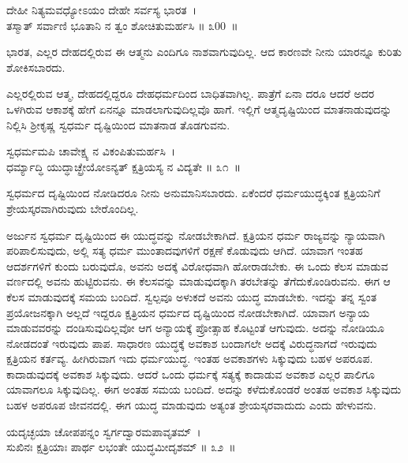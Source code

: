 \begin{shloka}
ದೇಹೀ ನಿತ್ಯಮವಧ್ಯೋಽಯಂ ದೇಹೇ ಸರ್ವಸ್ಯ ಭಾರತ~।\\ತಸ್ಮಾತ್ ಸರ್ವಾಣಿ ಭೂತಾನಿ ನ ತ್ವಂ ಶೋಚಿತುಮರ್ಹಸಿ \hfill॥ ೩00~॥
\end{shloka}

\begin{artha}
ಭಾರತ, ಎಲ್ಲರ ದೇಹದಲ್ಲಿರುವ ಈ ಆತ್ಮನು ಎಂದಿಗೂ ನಾಶವಾಗುವುದಿಲ್ಲ. ಆದ ಕಾರಣವೇ ನೀನು ಯಾರನ್ನೂ ಕುರಿತು ಶೋಕಿಸಬಾರದು.
\end{artha}

ಎಲ್ಲರಲ್ಲಿರುವ ಆತ್ಮ, ದೇಹದಲ್ಲಿದ್ದರೂ ದೇಹಧರ್ಮದಿಂದ ಬಾಧಿತವಾಗಿಲ್ಲ. ಪಾತ್ರೆಗೆ ಏನಾ ದರೂ ಆದರೆ ಅದರ ಒಳಗಿರುವ ಆಕಾಶಕ್ಕೆ ಹೇಗೆ ಏನನ್ನೂ ಮಾಡಲಾಗುವುದಿಲ್ಲವೊ ಹಾಗೆ. ಇಲ್ಲಿಗೆ ಆತ್ಮದೃಷ್ಟಿಯಿಂದ ಮಾತನಾಡುವುದನ್ನು ನಿಲ್ಲಿಸಿ ಶ‍್ರೀಕೃಷ್ಣ ಸ್ವಧರ್ಮ ದೃಷ್ಟಿಯಿಂದ ಮಾತನಾಡ ತೊಡಗುವನು.

\begin{shloka}
ಸ್ವಧರ್ಮಮಪಿ ಚಾವೇಕ್ಷ್ಯ ನ ವಿಕಂಪಿತುಮರ್ಹಸಿ~।\\ಧರ್ಮ್ಯಾದ್ಧಿ ಯುದ್ಧಾಚ್ಛ್ರೇಯೋಽನ್ಯತ್ ಕ್ಷತ್ರಿಯಸ್ಯ ನ ವಿದ್ಯತೇ \hfill॥ ೩೧~॥
\end{shloka}

\begin{artha}
ಸ್ವಧರ್ಮದ ದೃಷ್ಟಿಯಿಂದ ನೋಡಿದರೂ ನೀನು ಅನುಮಾನಿಸಬಾರದು. ಏಕೆಂದರೆ ಧರ್ಮಯುದ್ಧಕ್ಕಿಂತ ಕ್ಷತ್ರಿಯನಿಗೆ ಶ್ರೇಯಸ್ಕರವಾಗಿರುವುದು ಬೇರೊಂದಿಲ್ಲ.
\end{artha}

ಅರ್ಜುನ ಸ್ವಧರ್ಮ ದೃಷ್ಟಿಯಿಂದ ಈ ಯುದ್ಧವನ್ನು ನೋಡಬೇಕಾಗಿದೆ. ಕ್ಷತ್ರಿಯನ ಧರ್ಮ ರಾಜ್ಯವನ್ನು ನ್ಯಾಯವಾಗಿ ಪರಿಪಾಲಿಸುವುದು, ಅಲ್ಲಿ ಸತ್ಯ ಧರ್ಮ ಮುಂತಾದವುಗಳಿಗೆ ರಕ್ಷಣೆ ಕೊಡುವುದು ಆಗಿದೆ. ಯಾವಾಗ ಇಂತಹ ಆದರ್ಶಗಳಿಗೆ ಕುಂದು ಬರುವುದೊ, ಅವನು ಅದಕ್ಕೆ ವಿರೋಧವಾಗಿ ಹೋರಾಡಬೇಕು. ಈ ಒಂದು ಕೆಲಸ ಮಾಡುವ ವರ್ಣದಲ್ಲಿ ಅವನು ಹುಟ್ಟಿರುವನು. ಈ ಕೆಲಸವನ್ನು ಮಾಡುವುದಕ್ಕಾಗಿ ತರಬೇತನ್ನು ತೆಗೆದುಕೊಂಡಿರುವನು. ಈಗ ಆ ಕೆಲಸ ಮಾಡುವುದಕ್ಕೆ ಸಮಯ ಬಂದಿದೆ. ಸ್ವಲ್ಪವೂ ಅಳುಕದೆ ಅವನು ಯುದ್ಧ ಮಾಡಬೇಕು. ಇದನ್ನು ತನ್ನ ಸ್ವಂತ ಪ್ರಯೋಜನಕ್ಕಾಗಿ ಅಲ್ಲದೆ ಇದ್ದರೂ ಕ್ಷತ್ರಿಯನ ಧರ್ಮದ ದೃಷ್ಟಿಯಿಂದ ನೋಡಬೇಕಾಗಿದೆ. ಯಾವಾಗ ಅನ್ಯಾಯ ಮಾಡುವವರನ್ನು ದಂಡಿಸುವುದಿಲ್ಲವೋ ಆಗ ಅನ್ಯಾಯಕ್ಕೆ ಪ್ರೋತ್ಸಾಹ ಕೊಟ್ಟಂತೆ ಆಗುವುದು. ಅದನ್ನು ನೋಡಿಯೂ ನೋಡದಂತೆ ಇರುವುದು ಪಾಪ. ಸಾಧಾರಣ ಯುದ್ಧಕ್ಕೆ ಅವಕಾಶ ಬಂದಾಗಲೇ ಅದಕ್ಕೆ ವಿರುದ್ಧನಾಗದೆ ಇರುವುದು ಕ್ಷತ್ರಿಯನ ಕರ್ತವ್ಯ. ಹೀಗಿರುವಾಗ ಇದು ಧರ್ಮಯುದ್ಧ. ಇಂತಹ ಅವಕಾಶಗಳು ಸಿಕ್ಕುವುದು ಬಹಳ ಅಪರೂಪ. ಕಾದಾಡುವುದಕ್ಕೆ ಅವಕಾಶ ಸಿಕ್ಕುವುದು. ಆದರೆ ಒಂದು ಧರ್ಮಕ್ಕೆ ಸತ್ಯಕ್ಕೆ ಕಾದಾಡುವ ಅವಕಾಶ ಎಲ್ಲರ ಪಾಲಿಗೂ ಯಾವಾಗಲೂ ಸಿಕ್ಕುವುದಿಲ್ಲ. ಈಗ ಅಂತಹ ಸಮಯ ಬಂದಿದೆ. ಅದನ್ನು ಕಳೆದುಕೊಂಡರೆ ಅಂತಹ ಅವಕಾಶ ಸಿಕ್ಕುವುದು ಬಹಳ ಅಪರೂಪ ಜೀವನದಲ್ಲಿ. ಈಗ ಯುದ್ಧ ಮಾಡುವುದು ಅತ್ಯಂತ ಶ್ರೇಯಸ್ಕರವಾದುದು ಎಂದು ಹೇಳುವನು.

\begin{shloka}
ಯದೃಚ್ಛಯಾ ಚೋಪಪನ್ನಂ ಸ್ವರ್ಗದ್ವಾರಮಪಾವೃತಮ್~।\\ಸುಖಿನಃ ಕ್ಷತ್ರಿಯಾಃ ಪಾರ್ಥ ಲಭಂತೇ ಯುದ್ಧಮೀದೃಶಮ್ \hfill॥ ೩೨~॥
\end{shloka}

